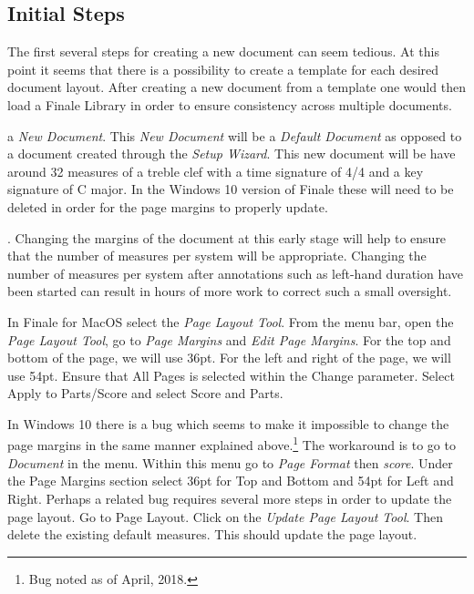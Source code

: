 \documentclass[]{tufte-book} %
\begin{document}
\subsection{Initial Steps}
\label{sec:initial-steps}

The first several steps for creating a new document can seem
tedious. At this point it seems that there is a possibility to create
a template for each desired document layout. After creating a new
document from a template one would then load a Finale Library in order
to ensure consistency across multiple documents.

 a \emph{New Document}. This \emph{New Document} will
be a \emph{Default Document} as opposed to a document created through
the \emph{Setup Wizard}. This new document will be have around 32
measures of a treble clef with a time signature of 4/4 and a key
signature of C major. In the Windows 10 version of Finale these will
need to be deleted in order for the page margins to properly update.

. Changing the margins of the document at this
early stage will help to ensure that the number of measures per system
will be appropriate. Changing the number of measures per system after
annotations such as left-hand duration have been started can result in
hours of more work to correct such a small oversight.

In Finale for MacOS select the \emph{Page Layout Tool}. From the menu
bar, open the \emph{Page Layout Tool}, go to \emph{Page Margins} and
\emph{Edit Page Margins}. For the top and bottom of the page, we will
use 36pt. For the left and right of the page, we will use 54pt. Ensure
that All Pages is selected within the Change parameter. Select Apply
to Parts/Score and select Score and Parts.

In Windows 10 there is a bug which seems to make it impossible to
change the page margins in the same manner explained
above.\footnote{Bug noted as of April, 2018.} The workaround is to go
to \emph{Document} in the menu. Within this menu go to \emph{Page
  Format} then \emph{score}. Under the Page Margins section select
36pt for Top and Bottom and 54pt for Left and Right. Perhaps a related
bug requires several more steps in order to update the page layout. Go
to Page Layout. Click on the \emph{Update Page Layout Tool}. Then
delete the existing default measures. This should update the page
layout.
\end{document}
